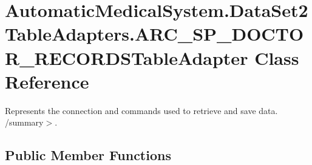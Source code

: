 \section{AutomaticMedicalSystem.DataSet2TableAdapters.ARC\_\-SP\_\-DOCTOR\_\-RECORDSTableAdapter Class Reference}
\label{class_automatic_medical_system_1_1_data_set2_table_adapters_1_1_a_r_c___s_p___d_o_c_t_o_r___r_e_c_o_r_d_s_table_adapter}
Represents the connection and commands used to retrieve and save data. /summary$>$.  


\subsection*{Public Member Functions}
